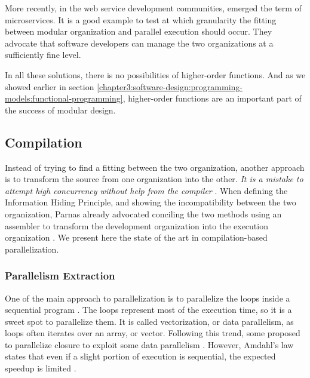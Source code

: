 More recently, in the web service development communities, emerged the term of microservices.
It is a good example to test at which granularity the fitting between modular organization and parallel execution should occur.
They advocate that software developers can manage the two organizations at a sufficiently fine level.

In all these solutions, there is no possibilities of higher-order functions.
And as we showed earlier in section \ref{chapter3:software-design:programming-models:functional-programming}, higher-order functions are an important part of the success of modular design.

\subsection{Compilation}


Instead of trying to find a fitting between the two organization, another approach is to transform the source from one organization into the other.
\textit{It is a mistake to attempt high concurrency without help from the compiler} \cite{Behren2003}.
When defining the Information Hiding Principle, and showing the incompatibility between the two organization, Parnas already advocated conciling the two methods using an assembler to transform the development organization into the execution organization \cite{Parnas1972}.
We present here the state of the art in compilation-based parallelization.


\subsubsection{Parallelism Extraction}


One of the main approach to parallelization is to parallelize the loops inside a sequential program \cite{Amarasinghe1995,Banerjee2013,Radoi2014}.
The loops represent most of the execution time, so it is a sweet spot to parallelize them.
It is called vectorization, or data parallelism, as loops often iterates over an array, or vector.
Following this trend, some proposed to parallelize closure to exploit some data parallelism \cite{Matsakis2012a}.
However, Amdahl's law states that even if a slight portion of execution is sequential, the expected speedup is limited \cite{Amdahl1967,Clements2013a}.

